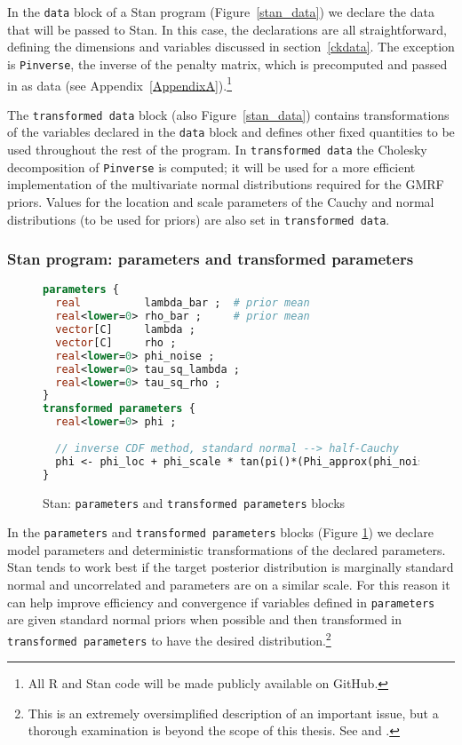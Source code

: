 In the {\tt data} block of a Stan program (Figure~\ref{stan_data}) we declare the data that will 
be passed to Stan. In this case, the declarations are all straightforward, defining the dimensions 
and variables discussed in section~\ref{ckdata}. The exception is {\tt Pinverse}, the inverse of 
the penalty matrix, which is precomputed and passed in as data 
(see Appendix~\ref{AppendixA}).\footnote{All R and Stan code will be made publicly 
available on GitHub.}

The {\tt transformed data} block (also Figure~\ref{stan_data}) contains transformations of the 
variables declared in the {\tt data} block and defines other fixed quantities to be used throughout 
the rest of the program. In {\tt transformed data} the Cholesky decomposition of {\tt Pinverse} is 
computed; it will be used for a more efficient implementation of the multivariate normal distributions 
required for the GMRF priors. Values for the location and scale parameters of the Cauchy and 
normal distributions (to be used for priors) are also set in {\tt transformed data}. 


\subsubsection{Stan program: parameters and transformed parameters}

\begin{figure}[t]
\begin{lstlisting}[language=Stan, frame=trBL]
parameters {
  real          lambda_bar ;  # prior mean 
  real<lower=0> rho_bar ;     # prior mean 
  vector[C]     lambda ;      
  vector[C]     rho ;
  real<lower=0> phi_noise ;    
  real<lower=0> tau_sq_lambda ;  
  real<lower=0> tau_sq_rho ;
}
transformed parameters {
  real<lower=0> phi ;
  
  // inverse CDF method, standard normal --> half-Cauchy
  phi <- phi_loc + phi_scale * tan(pi()*(Phi_approx(phi_noise) - 0.5)) ;
}
\end{lstlisting}
\caption{Stan: {\tt parameters} and {\tt transformed parameters} blocks}
\label{stan_parameters}
\end{figure}

In the {\tt parameters} and {\tt transformed parameters} blocks (Figure \ref{stan_parameters}) 
we declare model parameters and deterministic transformations of the declared parameters. 
Stan tends to work best if the target posterior distribution is marginally standard normal and 
uncorrelated and parameters are on a similar scale. For this reason it can help improve 
efficiency and convergence if variables defined in {\tt parameters} are given standard normal 
priors when possible and then transformed in {\tt transformed parameters} to have the desired 
distribution.\footnote{This is an extremely oversimplified description of an important issue, but 
a thorough examination is beyond the scope of this thesis. See  
and .} 


